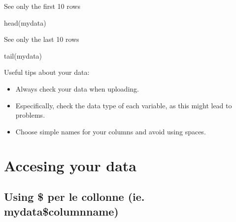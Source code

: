 \documentclass[
]{book}
\newenvironment{Shaded}{\begin{snugshade}}{\end{snugshade}}
\newcommand{\FunctionTok}[1]{\textcolor[rgb]{0.00,0.00,0.00}{#1}}
\newcommand{\NormalTok}[1]{#1}
\newcommand{\SpecialCharTok}[1]{\textcolor[rgb]{0.00,0.00,0.00}{#1}}
\begin{document}
See only the first 10 rows

\begin{Shaded}
\begin{Highlighting}[]
\FunctionTok{head}\NormalTok{(mydata)}
\end{Highlighting}
\end{Shaded}

See only the last 10 rows

\begin{Shaded}
\begin{Highlighting}[]
\FunctionTok{tail}\NormalTok{(mydata)}
\end{Highlighting}
\end{Shaded}

Useful tips about your data:

\begin{itemize}
\item
  Always check your data when uploading.
\item
  Especifically, check the data type of each variable, as this might lead to problems.
\item
  Choose simple names for your columns and avoid using spaces.
\end{itemize}

\hypertarget{accesing-your-data}{%
\section{Accesing your data}\label{accesing-your-data}}

\hypertarget{using-per-le-collonne-ie.-mydatacolumnname}{%
\subsection{Using \$ per le collonne (ie. mydata\$columnname)}\label{using-per-le-collonne-ie.-mydatacolumnname}}

\begin{Shaded}
\end{Shaded}
\end{document}

